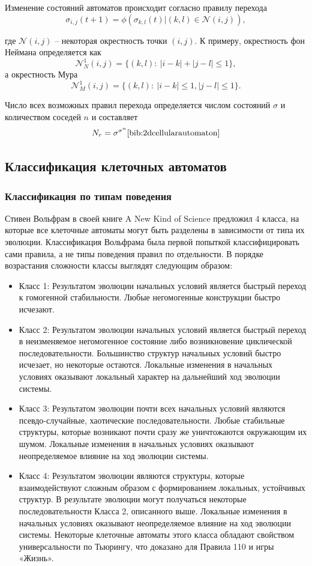 \documentclass[a4paper, final]{article}
\begin{document}
\noindent Изменение состояний автоматов происходит согласно правилу перехода
$$ \sigma _{i,j}(t+1)=\phi (\sigma _{k,l}(t)|(k,l)\in {\mathcal {N}}(i,j)),$$

\noindent где ${\mathcal {N}}(i,j)$ -- некоторая окрестность точки $(i,j)$. 
К примеру, окрестность фон Неймана определяется как 
$${\mathcal {N}}_{N}^{1}(i,j)=\{(k,l):~|i-k|+|j-l|\leq 1\},$$
\noindent а окрестность Мура
$$\displaystyle {\mathcal {N}}_{M}^{1}(i,j)=\{(k,l):~|i-k|\leq 1,|j-l|\leq 1\}.$$

Число всех возможных правил перехода определяется числом состояний 
$\sigma$ и количеством соседей $n$ и составляет 
$$N_{r}=\sigma ^{\sigma ^{n}}\cite{bib:2dcellularautomaton}$$ 

\subsection{Классификация клеточных автоматов}
\subsubsection{Классификация по типам поведения}
Стивен Вольфрам в своей книге A New Kind of Science предложил 4 класса, на которые 
все клеточные автоматы могут быть разделены в зависимости от типа их эволюции. 
Классификация Вольфрама была первой попыткой классифицировать сами правила, а не типы 
поведения правил по отдельности. В порядке возрастания сложности классы выглядят следующим 
образом:
\begin{itemize}
\item Класс 1: Результатом эволюции начальных условий является быстрый переход к гомогенной стабильности. Любые негомогенные конструкции быстро исчезают.
\item Класс 2: Результатом эволюции начальных условий является быстрый переход в неизменяемое негомогенное состояние либо возникновение циклической последовательности. Большинство структур начальных условий быстро исчезает, но некоторые остаются. Локальные изменения в начальных условиях оказывают локальный характер на дальнейший ход эволюции системы.
\item Класс 3: Результатом эволюции почти всех начальных условий являются псевдо-случайные, хаотические последовательности. Любые стабильные структуры, которые возникают почти сразу же уничтожаются окружающим их шумом. Локальные изменения в начальных условиях оказывают неопределяемое влияние на ход эволюции системы.
\item Класс 4: Результатом эволюции являются структуры, которые взаимодействуют сложным образом с формированием локальных, устойчивых структур. В результате эволюции могут получаться некоторые последовательности Класса 2, описанного выше. Локальные изменения в начальных условиях оказывают неопределяемое влияние на ход эволюции системы. Некоторые клеточные автоматы этого класса обладают свойством универсальности по Тьюрингу, что доказано для Правила 110 и игры «Жизнь».
\end{itemize}
\end{document}
